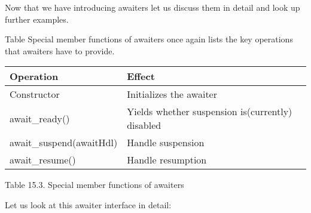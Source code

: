 
Now that we have introducing awaiters let us discuss them in detail and look up further examples.


Table Special member functions of awaiters once again lists the key operations that awaiters have to provide.

\begin{longtable}[c]{|l|l|}
\hline
\textbf{Operation}                & \textbf{Effect}                                           \\ \hline
\endfirsthead
%
\endhead
%
Constructor              & Initializes the awaiter                          \\ \hline
await\_ready()           & Yields whether suspension is(currently) disabled \\ \hline
await\_suspend(awaitHdl) & Handle suspension                                \\ \hline
await\_resume()          & Handle resumption                                \\ \hline
\end{longtable}

\begin{center}
Table 15.3. Special member functions of awaiters
\end{center}

Let us look at this awaiter interface in detail:

